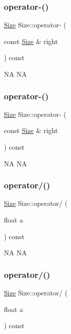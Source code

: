 \subsubsection{\texorpdfstring{operator-\/()}{operator-()}\hspace{0.1cm}{\footnotesize\ttfamily [1/2]}}
{\footnotesize\ttfamily \hyperlink{classSize}{Size} Size\+::operator-\/ (\begin{DoxyParamCaption}\item[{const \hyperlink{classSize}{Size} \&}]{right }\end{DoxyParamCaption}) const}

NA  NA \mbox{\label{classSize_a591e1fd7d3b14db4da48a836437becd9}} 
\subsubsection{\texorpdfstring{operator-\/()}{operator-()}\hspace{0.1cm}{\footnotesize\ttfamily [2/2]}}
{\footnotesize\ttfamily \hyperlink{classSize}{Size} Size\+::operator-\/ (\begin{DoxyParamCaption}\item[{const \hyperlink{classSize}{Size} \&}]{right }\end{DoxyParamCaption}) const}

NA  NA \mbox{\label{classSize_a38a29b34d6e233b29743defc4a69319a}} 
\subsubsection{\texorpdfstring{operator/()}{operator/()}\hspace{0.1cm}{\footnotesize\ttfamily [1/2]}}
{\footnotesize\ttfamily \hyperlink{classSize}{Size} Size\+::operator/ (\begin{DoxyParamCaption}\item[{float}]{a }\end{DoxyParamCaption}) const}

NA  NA \mbox{\label{classSize_a38a29b34d6e233b29743defc4a69319a}} 
\subsubsection{\texorpdfstring{operator/()}{operator/()}\hspace{0.1cm}{\footnotesize\ttfamily [2/2]}}
{\footnotesize\ttfamily \hyperlink{classSize}{Size} Size\+::operator/ (\begin{DoxyParamCaption}\item[{float}]{a }\end{DoxyParamCaption}) const}

